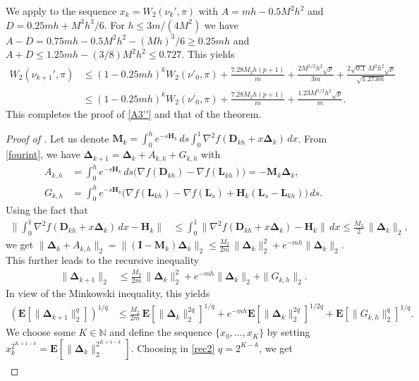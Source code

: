 \documentclass[aoap,preprint,reqno,a4paper]{imsart} %
\newcommand{\NN}{\mathbb{N}}
\newcommand{\bDelta}{\boldsymbol{\Delta}}
\newcommand{\bfE}{\mathbf E}
\newcommand{\bfH}{\mathbf H}
\newcommand{\bfM}{\mathbf M}
\newcommand{\bfI}{\mathbf I}
\newcommand{\bD}{\boldsymbol D}
\newcommand{\bL}{\boldsymbol L}
\begin{document}
We apply  to the sequence $x_k = W_2(\nu_k',\pi)$ with $A = mh-0.5M^2h^2$ and
$D = 0.25mh + M^3h^3/6$. For $h\le 3m/(4M^2)$ we have $A-D = 0.75mh- 0.5M^2h^2- (Mh)^3/6 \ge 0.25mh$ and
$A+D \le 1.25 mh -(3/8)M^2h^2 \le	0.727$. This yields
\begin{align}
W_2(\nu_{k+1}',\pi)
		&\le (1-0.25 mh)^k W_2(\nu'_0,\pi) + \frac{7.28 M_2h(p+1)}{m}  + \frac{2M^{5/2}h^2\sqrt{p}}{3m}+
		\frac{2\sqrt{0.1}\,M^2h^2\sqrt{p}}{\sqrt{1.273m}}\\
		&\le (1-0.25 mh)^k W_2(\nu'_0,\pi) + \frac{7.28 M_2h(p+1)}{m}  + \frac{1.23M^{5/2}h^2\sqrt{p}}{m}.
\end{align}
This completes the proof of \eqref{A3''} and that of the theorem.

\begin{proof}[Proof of ]
Let us denote $\bfM_k =\int_0^he^{-s\bfH_k}\,ds\int_0^1 \nabla^2 f(\bD_{kh}+x\bDelta_{k})\,dx$.
From \eqref{fourint}, we have $\bDelta_{k+1}=\bDelta_k + A_{k,h}  + G_{k,h}$
with
\begin{align}
A_{k,h} &= \int_0^he^{-s\bfH_k}\,ds\big(\nabla f(\bD_{kh})-\nabla f(\bL_{kh})\big)
			=  -\bfM_k\bDelta_k,\\
G_{k,h} &= \int_0^h e^{-s\bfH_k} \big(\nabla f(\bL_{kh})-\nabla f(\bL_s)+\bfH_k(\bL_s-\bL_{kh})\big)\,ds.
\end{align}
Using the fact that
\begin{align}
\bigg\|\int_0^1 \nabla^2 f(\bD_{kh}+x\bDelta_{k})\,dx - \bfH_k\bigg\|
		& \le  \int_0^1 \big\|\nabla^2 f(\bD_{kh}+x\bDelta_{k}) - \bfH_k\big\|\,dx\le \frac{M_2}2\,\|\bDelta_k\|_2,
\end{align}
we get $\|\bDelta_k+A_{k,h}\|_2= \|(\bfI-\bfM_k)\bDelta_k\|_2\le \frac{M_2}{2m}\,\|\bDelta_k\|_2^2+e^{-mh}\|\bDelta_k\|_2$.
This further leads to the recursive inequality
\begin{align}
\|\bDelta_{k+1}\|_2 &\le \frac{M_2}{2m}\,\|\bDelta_k\|_2^2+e^{-mh}\|\bDelta_k\|_2 + \|G_{k,h}\|_2.
\end{align}
In view of the Minkowski inequality, this yields
\begin{align}\label{rec2}
(\bfE[\|\bDelta_{k+1}\|_2^q])^{1/q} &\le \frac{M_2}{2m}\,\bfE[\|\bDelta_k\|_2^{2q}]^{1/q}+e^{-mh}
\bfE[\|\bDelta_k\|_2^{2q}]^{1/2q} + \bfE[\|G_{k,h}\|_2^q]^{1/q}.
\end{align}
We choose some $K\in\NN$ and define the sequence $\{x_0,\ldots,x_K\}$ by setting
$x_k^{2^{K+1-k}} = \bfE[\|\bDelta_{k}\|_2^{2^{K+1-k}}]$. Choosing in \eqref{rec2} $q = 2^{K-k}$,
we get
\begin{align}\label{rec3}

\end{align}
\end{proof}
\end{document}
